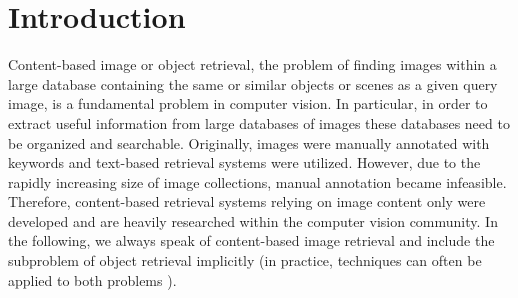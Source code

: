 \section{Introduction}

Content-based image or object retrieval,
the problem of finding images within a large database containing the same or similar objects or scenes as a given query image, is a fundamental problem in computer vision. In particular, in order to extract useful information from large databases of images these databases need to be organized and searchable.
Originally, images were manually annotated with keywords and text-based retrieval systems were utilized. However, due to the rapidly increasing size of image collections, manual annotation became infeasible. Therefore, content-based retrieval systems relying on image content only were developed and are heavily researched within the computer vision community.
In the following, we always speak of content-based image retrieval and include the subproblem of object retrieval implicitly (in practice, techniques can often be applied to both problems \cite{PhilbinChumIsardSivicZisserman:2007}).

